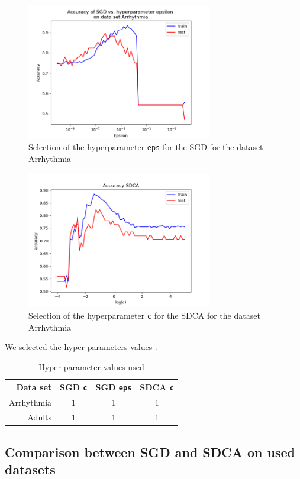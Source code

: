 \documentclass{article}
\begin{document}
\begin{figure}[H]
	\centering
	\includegraphics[height=6cm]{figs/hyperparams/SGD_eps.png}
	\caption{Selection of the hyperparameter \texttt{eps} for the SGD for the dataset Arrhythmia}
\end{figure}

\begin{figure}[H]
	\centering
	\includegraphics[height=6cm]{figs/hyperparams/SDCA_c.png}
	\caption{Selection of the hyperparameter \texttt{c} for the SDCA for the dataset Arrhythmia}
\end{figure}

We selected the hyper parameters values :

\begin{table}[H]
	\centering
	\begin{tabular}{|r|c|c|c|}
		\hline
		Data set & SGD \texttt{c} & SGD \texttt{eps} & SDCA \texttt{c}\\
		\hline
		Arrhythmia & 1 & 1 & 1\\
		Adults & 1 & 1 & 1\\
		\hline
	\end{tabular}
	\caption{Hyper parameter values used}
\end{table}

\subsection{Comparison between SGD and SDCA on used datasets}
\end{document}
